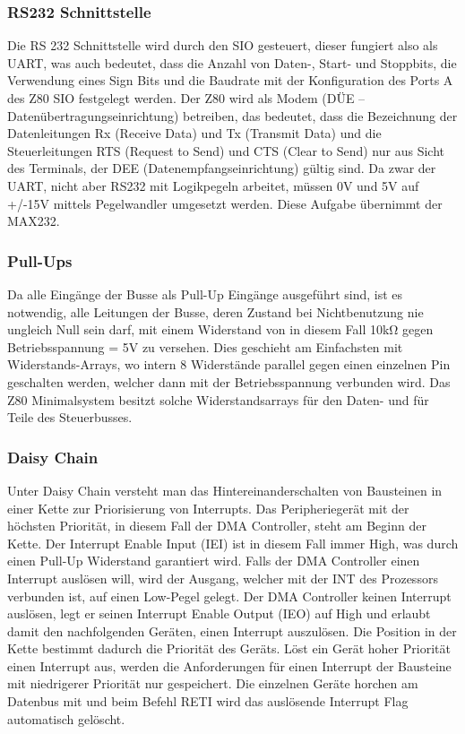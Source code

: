 \subsubsection{RS232 Schnittstelle}
Die RS 232 Schnittstelle wird durch den SIO gesteuert, dieser fungiert also als UART, was auch bedeutet, dass die Anzahl von Daten-, Start- und Stoppbits, die Verwendung eines Sign Bits und die Baudrate mit der Konfiguration des Ports A des Z80 SIO festgelegt werden. Der Z80 wird als Modem (DÜE – Datenübertragungseinrichtung) betreiben, das bedeutet, dass die Bezeichnung der Datenleitungen Rx (Receive Data) und Tx (Transmit Data) und die Steuerleitungen RTS (Request to Send) und CTS (Clear to Send) nur aus Sicht des Terminals, der DEE (Datenempfangseinrichtung) gültig sind. Da zwar der UART, nicht aber RS232 mit Logikpegeln arbeitet, müssen 0V und 5V auf +/-15V mittels Pegelwandler umgesetzt werden. Diese Aufgabe übernimmt der MAX232.

\subsubsection{Pull-Ups}
Da alle Eingänge der Busse als Pull-Up Eingänge ausgeführt sind, ist es notwendig, alle Leitungen der Busse, deren Zustand bei Nichtbenutzung nie ungleich Null sein darf, mit einem Widerstand von in diesem Fall 10kΩ gegen Betriebsspannung = 5V zu versehen. Dies geschieht am Einfachsten mit Widerstands-Arrays, wo intern 8 Widerstände parallel gegen einen einzelnen Pin geschalten werden, welcher dann mit der Betriebsspannung verbunden wird. Das Z80 Minimalsystem besitzt solche Widerstandsarrays für den Daten- und für Teile des Steuerbusses.

\subsubsection{Daisy Chain}
Unter Daisy Chain versteht man das Hintereinanderschalten von Bausteinen in einer Kette zur Priorisierung von Interrupts. Das Peripheriegerät mit der höchsten Priorität, in diesem Fall der DMA Controller, steht am Beginn der Kette. Der Interrupt Enable Input (IEI) ist in diesem Fall immer High, was durch einen Pull-Up Widerstand garantiert wird. Falls der DMA Controller einen Interrupt auslösen will, wird der Ausgang, welcher mit der INT des Prozessors verbunden ist, auf einen Low-Pegel gelegt. Der DMA Controller keinen Interrupt auslösen, legt er seinen Interrupt Enable Output (IEO) auf High und erlaubt damit den nachfolgenden Geräten, einen Interrupt auszulösen. Die Position in der Kette bestimmt dadurch die Priorität des Geräts. Löst ein Gerät hoher Priorität einen Interrupt aus, werden die Anforderungen für einen Interrupt der Bausteine mit niedrigerer Priorität nur gespeichert. Die einzelnen Geräte horchen am Datenbus mit und beim Befehl RETI wird das auslösende Interrupt Flag automatisch gelöscht.

